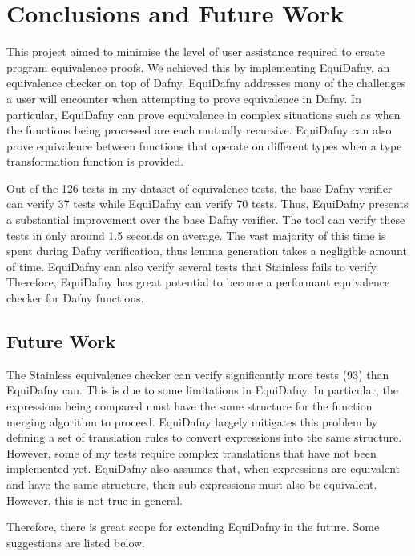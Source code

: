 \chapter{Conclusions and Future Work}\label{chp:conclusions}

This project aimed to minimise the level of user assistance required to create program equivalence proofs. We achieved this by implementing EquiDafny, an equivalence checker on top of Dafny. EquiDafny addresses many of the challenges a user will encounter when attempting to prove equivalence in Dafny. In particular, EquiDafny can prove equivalence in complex situations such as when the functions being processed are each mutually recursive. EquiDafny can also prove equivalence between functions that operate on different types when a type transformation function is provided.

Out of the 126 tests in my dataset of equivalence tests, the base Dafny verifier can verify 37 tests while EquiDafny can verify 70 tests. Thus, EquiDafny presents a substantial improvement over the base Dafny verifier. The tool can verify these tests in only around 1.5 seconds on average. The vast majority of this time is spent during Dafny verification, thus lemma generation takes a negligible amount of time. EquiDafny can also verify several tests that Stainless fails to verify. Therefore, EquiDafny has great potential to become a performant equivalence checker for Dafny functions. 

\section{Future Work}\label{sec:future-work}

The Stainless equivalence checker can verify significantly more tests (93) than EquiDafny can. This is due to some limitations in EquiDafny. In particular, the expressions being compared must have the same structure for the function merging algorithm to proceed. EquiDafny largely mitigates this problem by defining a set of translation rules to convert expressions into the same structure. However, some of my tests require complex translations that have not been implemented yet. EquiDafny also assumes that, when expressions are equivalent and have the same structure, their sub-expressions must also be equivalent. However, this is not true in general.  

Therefore, there is great scope for extending EquiDafny in the future. Some suggestions are listed below.

